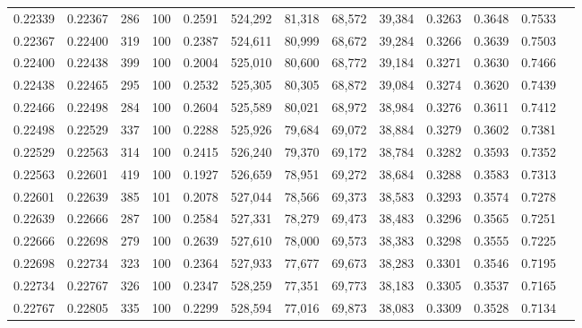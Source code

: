 \begin{tabular}{rrrrrrrrrrrrr}
0.22339 & 0.22367 &   286 & 100 &                                     0.2591 & 524,292 &  81,318 &  68,572 &  39,384 & 0.3263 & 0.3648 & 0.7533 \\
0.22367 & 0.22400 &   319 & 100 &                                     0.2387 & 524,611 &  80,999 &  68,672 &  39,284 & 0.3266 & 0.3639 & 0.7503 \\
0.22400 & 0.22438 &   399 & 100 &                                     0.2004 & 525,010 &  80,600 &  68,772 &  39,184 & 0.3271 & 0.3630 & 0.7466 \\
0.22438 & 0.22465 &   295 & 100 &                                     0.2532 & 525,305 &  80,305 &  68,872 &  39,084 & 0.3274 & 0.3620 & 0.7439 \\
0.22466 & 0.22498 &   284 & 100 &                                     0.2604 & 525,589 &  80,021 &  68,972 &  38,984 & 0.3276 & 0.3611 & 0.7412 \\
0.22498 & 0.22529 &   337 & 100 &                                     0.2288 & 525,926 &  79,684 &  69,072 &  38,884 & 0.3279 & 0.3602 & 0.7381 \\
0.22529 & 0.22563 &   314 & 100 &                                     0.2415 & 526,240 &  79,370 &  69,172 &  38,784 & 0.3282 & 0.3593 & 0.7352 \\
0.22563 & 0.22601 &   419 & 100 &                                     0.1927 & 526,659 &  78,951 &  69,272 &  38,684 & 0.3288 & 0.3583 & 0.7313 \\
0.22601 & 0.22639 &   385 & 101 &                                     0.2078 & 527,044 &  78,566 &  69,373 &  38,583 & 0.3293 & 0.3574 & 0.7278 \\
0.22639 & 0.22666 &   287 & 100 &                                     0.2584 & 527,331 &  78,279 &  69,473 &  38,483 & 0.3296 & 0.3565 & 0.7251 \\
0.22666 & 0.22698 &   279 & 100 &                                     0.2639 & 527,610 &  78,000 &  69,573 &  38,383 & 0.3298 & 0.3555 & 0.7225 \\
0.22698 & 0.22734 &   323 & 100 &                                     0.2364 & 527,933 &  77,677 &  69,673 &  38,283 & 0.3301 & 0.3546 & 0.7195 \\
0.22734 & 0.22767 &   326 & 100 &                                     0.2347 & 528,259 &  77,351 &  69,773 &  38,183 & 0.3305 & 0.3537 & 0.7165 \\
0.22767 & 0.22805 &   335 & 100 &                                     0.2299 & 528,594 &  77,016 &  69,873 &  38,083 & 0.3309 & 0.3528 & 0.7134 \\

\end{tabular}
